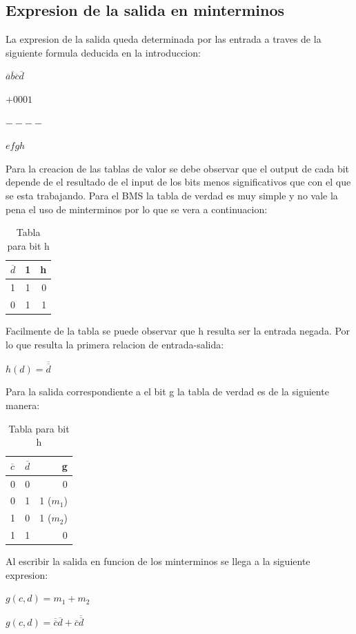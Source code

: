 \documentclass{article}
\begin{document}
	\subsection{Expresion de la salida en minterminos}
		\hspace{10mm} La expresion de la salida queda determinada por las entrada a traves de la siguiente formula deducida en la introduccion:
		\newline \centerline{$\overline{a} \overline{b} \overline{c} \overline{d}$}
		\newline \centerline{$+0001$}
		\newline \centerline{$----$}
		\newline \centerline{$efgh$}	
		\newline \hspace{10mm} Para la creacion de las tablas de valor se debe observar que el output de cada bit depende de el resultado de el input de los bits menos significativos que con el que se esta trabajando.
		\newline Para el BMS la tabla de verdad es muy simple y no vale la pena el uso de minterminos por lo que se vera a continuacion:
		\begin{table}[h!]
			\begin{center}
				\caption{Tabla para bit h}
				\begin{tabular}{l|c|r}
				\textbf{$\overline{d}$} & \textbf{1} & \textbf{h}\\
				\hline
				1 & 1 & 0 \\
				0 & 1 & 1 \\			
				\end{tabular}
			\end{center}
		\end{table}
		\newline Facilmente de la tabla se puede observar que h resulta ser la entrada negada. Por lo que resulta la primera relacion de entrada-salida:
		\newline \centerline{$h(d)=\overline{\overline{d}}$}
		\newline Para la salida correspondiente a el bit g la tabla de verdad es de la siguiente manera:
		\begin{table}[h!]
			\begin{center}
				\caption{Tabla para bit h}
				\begin{tabular}{l|c|r}
				\textbf{$\overline{c}$} & \textbf{$\overline{d}$} & \textbf{g}\\
				\hline
				0 & 0 & 0 \\
				0 & 1 & 1 ($m_{1}$) \\	
				1 & 0 & 1 ($m_{2}$)\\
				1 & 1 & 0 \\			
				\end{tabular}
			\end{center}
		\end{table}	
		\newline Al escribir la salida en funcion de los minterminos se llega a la siguiente expresion:
		\newline \centerline{$g(c,d)=m_{1}+m_{2}$}
		\newline \centerline{$g(c,d)=\overline{\overline{c}}\overline{d}+\overline{c}\overline{\overline{d}}$}
\end{document}
